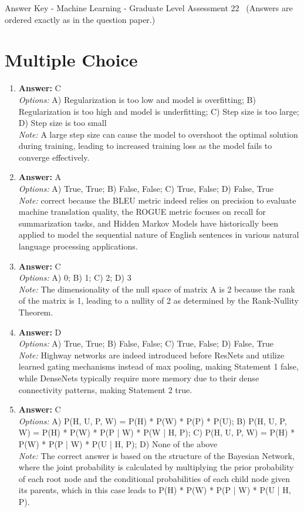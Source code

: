 \documentclass[12pt]{article}
\begin{document}
\begin{center}
Answer Key - Machine Learning - Graduate Level Assessment 22 \
\small (Answers are ordered exactly as in the question paper.)
\end{center}

\section*{Multiple Choice}
\begin{enumerate}[label=\arabic*.]
\item \textbf{Answer:} C
\\ \textit{Options:} A) Regularization is too low and model is overfitting; B) Regularization is too high and model is underfitting; C) Step size is too large; D) Step size is too small
\\ \textit{Note:} A large step size can cause the model to overshoot the optimal solution during training, leading to increased training loss as the model fails to converge effectively.
\item \textbf{Answer:} A
\\ \textit{Options:} A) True, True; B) False, False; C) True, False; D) False, True
\\ \textit{Note:} correct because the BLEU metric indeed relies on precision to evaluate machine translation quality, the ROGUE metric focuses on recall for summarization tasks, and Hidden Markov Models have historically been applied to model the sequential nature of English sentences in various natural language processing applications.
\item \textbf{Answer:} C
\\ \textit{Options:} A) 0; B) 1; C) 2; D) 3
\\ \textit{Note:} The dimensionality of the null space of matrix A is 2 because the rank of the matrix is 1, leading to a nullity of 2 as determined by the Rank-Nullity Theorem.
\item \textbf{Answer:} D
\\ \textit{Options:} A) True, True; B) False, False; C) True, False; D) False, True
\\ \textit{Note:} Highway networks are indeed introduced before ResNets and utilize learned gating mechanisms instead of max pooling, making Statement 1 false, while DenseNets typically require more memory due to their dense connectivity patterns, making Statement 2 true.
\item \textbf{Answer:} C
\\ \textit{Options:} A) P(H, U, P, W) = P(H) * P(W) * P(P) * P(U); B) P(H, U, P, W) = P(H) * P(W) * P(P | W) * P(W | H, P); C) P(H, U, P, W) = P(H) * P(W) * P(P | W) * P(U | H, P); D) None of the above
\\ \textit{Note:} The correct answer is based on the structure of the Bayesian Network, where the joint probability is calculated by multiplying the prior probability of each root node and the conditional probabilities of each child node given its parents, which in this case leads to P(H) * P(W) * P(P | W) * P(U | H, P).
\end{enumerate}
\end{document}
